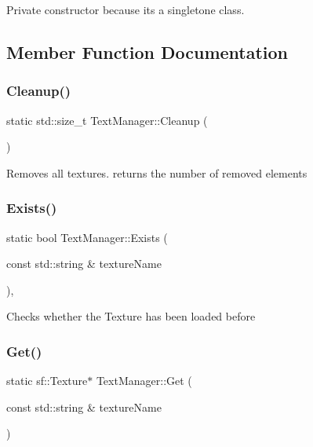 Private constructor because it\textquotesingle{}s a singletone class. 

\subsection{Member Function Documentation}
\mbox{\label{class_text_manager_a49d82957f1c2915df70ba01b8ba1eb99}} 
\subsubsection{\texorpdfstring{Cleanup()}{Cleanup()}}
{\footnotesize\ttfamily static std\+::size\+\_\+t Text\+Manager\+::\+Cleanup (\begin{DoxyParamCaption}{ }\end{DoxyParamCaption})\hspace{0.3cm}{\ttfamily [static]}}

Removes all textures. returns the number of removed elements \mbox{\label{class_text_manager_a2d7c607da9112ef63ae84d4b9d8bd5cd}} 
\subsubsection{\texorpdfstring{Exists()}{Exists()}}
{\footnotesize\ttfamily static bool Text\+Manager\+::\+Exists (\begin{DoxyParamCaption}\item[{const std\+::string \&}]{texture\+Name }\end{DoxyParamCaption})\hspace{0.3cm}{\ttfamily [inline]}, {\ttfamily [static]}}

Checks whether the Texture has been loaded before \mbox{\label{class_text_manager_a67f615b512e31f77d93be69715876d31}} 
\subsubsection{\texorpdfstring{Get()}{Get()}}
{\footnotesize\ttfamily static sf\+::\+Texture$\ast$ Text\+Manager\+::\+Get (\begin{DoxyParamCaption}\item[{const std\+::string \&}]{texture\+Name }\end{DoxyParamCaption})\hspace{0.3cm}{\ttfamily [static]}}

